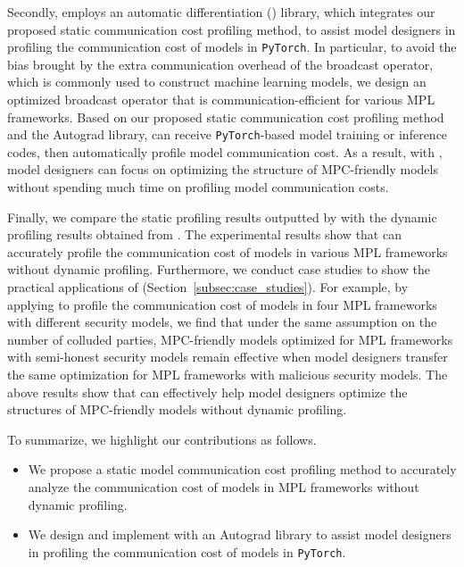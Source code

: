 Secondly, \hawkeye employs an automatic differentiation () library, which integrates our proposed static communication cost profiling method, to assist model designers in profiling the communication cost of models in \texttt{PyTorch}. In particular, to avoid the bias brought by the extra communication overhead of the broadcast operator, which is commonly used to construct machine learning models, we design an optimized broadcast operator that is communication-efficient for various MPL frameworks. Based on our proposed static communication cost profiling method and the Autograd library, \hawkeye can receive \texttt{PyTorch}-based model training or inference codes, then automatically profile model communication cost. As a result, with \hawkeye, model designers can focus on optimizing the structure of MPC-friendly models without spending much time on profiling model communication costs.

Finally, we compare the static profiling results outputted by \hawkeye with the dynamic profiling results obtained from . The experimental results show that \hawkeye can accurately profile the communication cost of models in various MPL frameworks without dynamic profiling. Furthermore, we conduct  case studies to show the practical applications of \hawkeye (Section~\ref{subsec:case_studies}). For example, by applying \hawkeye to profile the communication cost of models in four MPL frameworks with different security models, we find that under the same assumption on the number of colluded parties, MPC-friendly models optimized for MPL frameworks with semi-honest security models remain effective when model designers transfer the same optimization for MPL frameworks with malicious security models. The above results show that  \hawkeye can effectively help model designers optimize the structures of MPC-friendly models without dynamic profiling. 

To summarize, we highlight our contributions as follows.
\begin{itemize}
    \item  We propose a static model communication cost profiling method to accurately analyze the communication cost of models in MPL frameworks without dynamic profiling.
    
    \item  We design and implement \hawkeye with an Autograd library to assist model designers in profiling the communication cost of models in \texttt{PyTorch}. 
\end{itemize}

